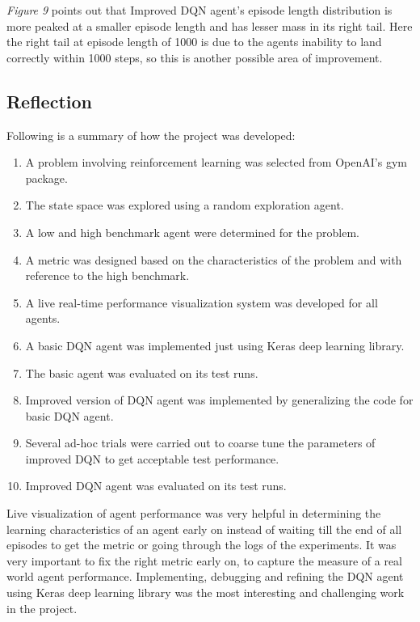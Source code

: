 \documentclass{article}
\begin{document}
\textit{Figure 9} points out that Improved DQN agent's episode length distribution is more peaked at a smaller episode length and has lesser mass in its right tail. Here the right tail at episode length of 1000 is due to the agents inability to land correctly within 1000 steps, so this is another possible area of improvement.
\subsection*{Reflection}
Following is a summary of how the project was developed:
\begin{enumerate}
	\item A problem involving reinforcement learning was selected from OpenAI's gym package.
	\item The state space was explored using a random exploration agent.
	\item A low and high benchmark agent were determined for the problem.
	\item A metric was designed based on the characteristics of the problem and with reference to the high benchmark.
	\item A live real-time performance visualization system was developed for all agents.
	\item A basic DQN agent was implemented just using Keras deep learning library.
	\item The basic agent was evaluated on its test runs.
	\item Improved version of DQN agent was implemented by generalizing the code for basic DQN agent.
	\item Several ad-hoc trials were carried out to coarse tune the parameters of improved DQN to get acceptable test performance.
	\item Improved DQN agent was evaluated on its test runs.
\end{enumerate}
Live visualization of agent performance was very helpful in determining the learning characteristics of an agent early on instead of waiting till the end of all episodes to get the metric or going through the logs of the experiments. It was very important to fix the right metric early on, to capture the measure of a real world agent performance. Implementing, debugging and refining the DQN agent using Keras deep learning library was the most interesting and challenging work in the project.
\end{document}
